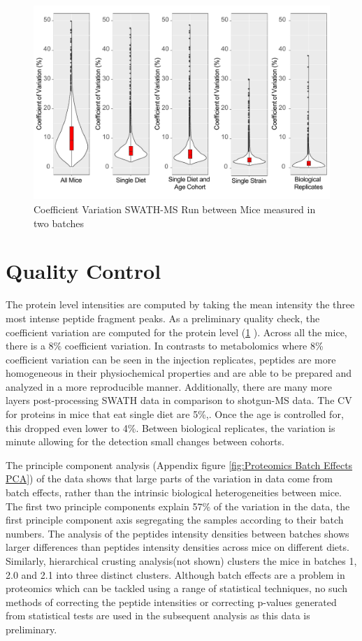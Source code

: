 \documentclass[a4paper,11pt,twoside]{book}
\begin{document}
	\begin{figure}[htb!]
		\includegraphics[width=\linewidth]{3.Proteomics/protein_cvs_figure.pdf}
		\caption{Coefficient Variation SWATH-MS Run between Mice measured in two batches}
		\label{CV Analysis Proteomic Data}
	\end{figure}
	
	\section{Quality Control}
		
	The protein level intensities are computed by taking the mean intensity the three most intense peptide fragment peaks. As a preliminary quality check, the coefficient variation are computed for the protein level (\ref{CV Analysis Proteomic Data} ). Across all the mice, there is a 8\% coefficient variation. In contrasts to metabolomics where 8\% coefficient variation can be seen in the injection replicates, peptides are more homogeneous in their physiochemical properties and are able to be prepared and analyzed in a more reproducible manner. Additionally, there are many more layers post-processing SWATH data in comparison to shotgun-MS data. The CV for  proteins in mice that eat single diet are 5\%,. Once the age is controlled for, this dropped even lower to 4\%. Between biological replicates, the variation is minute allowing for the detection small changes between cohorts.
	
	The principle component analysis (Appendix figure \ref{fig:Proteomics Batch Effects PCA}) of the data shows that large parts of the variation in data come from batch effects, rather than the intrinsic biological heterogeneities between mice. The first two principle components explain 57\% of the variation in the data, the first principle component axis segregating the samples according to their batch numbers. The analysis of the peptides intensity densities between batches shows larger differences than peptides intensity densities across mice on different diets. Similarly, hierarchical crusting analysis(not shown) clusters the mice in batches 1, 2.0 and 2.1 into three distinct clusters. Although batch effects are a problem in proteomics which can be tackled using a range of statistical techniques\citep{Leek2010TacklingBatchEffects}, no such methods of correcting the peptide intensities or correcting p-values generated from statistical tests are used in the subsequent analysis as this data is preliminary.
		
\end{document}
